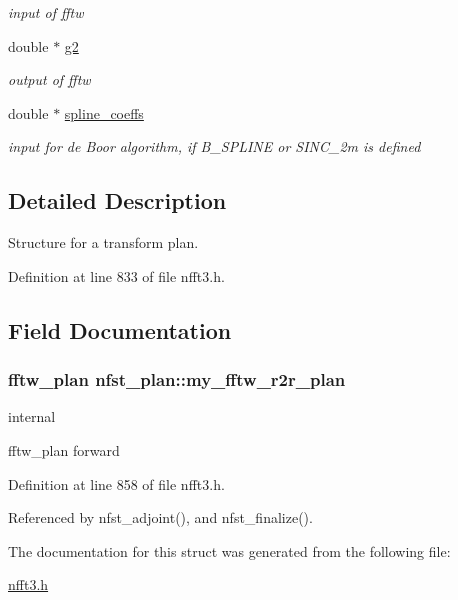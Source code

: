 \begin{CompactItemize}
\begin{CompactList}\small\item\em input of fftw \item\end{CompactList}\item 
\hypertarget{structnfst__plan_7b67e2cf657227ae46d13fa239d534f7}{
double $\ast$ \hyperlink{structnfst__plan_7b67e2cf657227ae46d13fa239d534f7}{g2}}
\label{structnfst__plan_7b67e2cf657227ae46d13fa239d534f7}

\begin{CompactList}\small\item\em output of fftw \item\end{CompactList}\item 
\hypertarget{structnfst__plan_23bec4401a652efc87ee6781061c9363}{
double $\ast$ \hyperlink{structnfst__plan_23bec4401a652efc87ee6781061c9363}{spline\_\-coeffs}}
\label{structnfst__plan_23bec4401a652efc87ee6781061c9363}

\begin{CompactList}\small\item\em input for de Boor algorithm, if B\_\-SPLINE or SINC\_\-2m is defined \item\end{CompactList}\end{CompactItemize}


\subsection{Detailed Description}
Structure for a transform plan. 

Definition at line 833 of file nfft3.h.

\subsection{Field Documentation}
\hypertarget{structnfst__plan_f14a8654877825238cc8a6f39d425d7b}{
\subsubsection{\setlength{\rightskip}{0pt plus 5cm}fftw\_\-plan {\bf nfst\_\-plan::my\_\-fftw\_\-r2r\_\-plan}}}
\label{structnfst__plan_f14a8654877825238cc8a6f39d425d7b}


internal 

fftw\_\-plan forward 

Definition at line 858 of file nfft3.h.

Referenced by nfst\_\-adjoint(), and nfst\_\-finalize().

The documentation for this struct was generated from the following file:\begin{CompactItemize}
\item 
\hyperlink{nfft3_8h}{nfft3.h}\end{CompactItemize}
